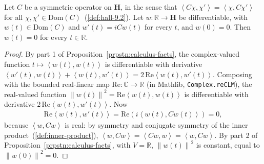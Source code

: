 \begin{lemma}[A Solution of $w' = iCw$ with $C$ Symmetric Preserves the Norm]
    \label{lmm:norm-const-of-symmetric-derivative}
    \leanok
    Let $C$ be a symmetric operator on $\mathbf{H}$, in the sense that $\left< C\chi, \chi' \right> = \left< \chi, C\chi' \right>$ for all $\chi, \chi' \in \text{Dom}(C)$~(\ref{def:hall-9.2}). Let $w : \mathbb{R} \rightarrow \mathbf{H}$ be differentiable, with $w(t) \in \text{Dom}(C)$ and $w'(t) = iCw(t)$ for every $t$, and $w(0) = 0$. Then $w(t) = 0$ for every $t \in \mathbb{R}$.
\end{lemma}
\begin{proof}
    \leanok
By part 1 of Proposition~\ref{prpstn:calculus-facts}, the complex-valued function $t \mapsto \left< w(t), w(t) \right>$ is differentiable with derivative $\left< w'(t), w(t) \right> + \left< w(t), w'(t) \right> = 2\,\text{Re}\left< w(t), w'(t) \right>$. Composing with the bounded real-linear map $\text{Re} : \mathbb{C} \rightarrow \mathbb{R}$ (in Mathlib, \texttt{Complex.reCLM}), the real-valued function $\left\| w(t) \right\|^2 = \text{Re}\left< w(t), w(t) \right>$ is differentiable with derivative $2\,\text{Re}\left< w(t), w'(t) \right>$. Now
\begin{align}
    \text{Re}\left< w(t), w'(t) \right> = \text{Re}\left( i\left< w(t), Cw(t) \right> \right) = 0,
\end{align}
because $\left< w, Cw \right>$ is real: by symmetry and conjugate symmetry of the inner product~(\ref{def:inner-product}), $\left< w, Cw \right> = \left< Cw, w \right> = \overline{\left< w, Cw \right>}$. By part 2 of Proposition~\ref{prpstn:calculus-facts}, with $V = \mathbb{R}$, $\left\| w(t) \right\|^2$ is constant, equal to $\left\| w(0) \right\|^2 = 0$.
\end{proof}

